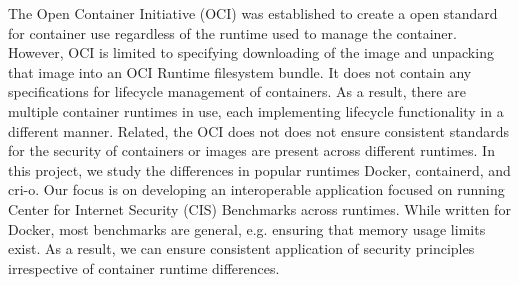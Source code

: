 The Open Container Initiative (OCI) was established to create a open standard for container use regardless of the runtime used to manage the container. However, OCI is limited to specifying downloading of the image and unpacking that image into an OCI Runtime filesystem bundle. It does not contain any specifications for lifecycle management of containers. As a result, there are multiple container runtimes in use, each implementing lifecycle functionality in a different manner. Related, the OCI does not does not ensure consistent standards for the security of containers or images are present across different runtimes. In this project, we study the differences in popular runtimes Docker, containerd, and cri-o. Our focus is on developing an interoperable application focused on running Center for Internet Security (CIS) Benchmarks across runtimes. While written for Docker, most benchmarks are general, e.g. ensuring that memory usage limits exist. As a result, we can ensure consistent application of security principles irrespective of container runtime differences.